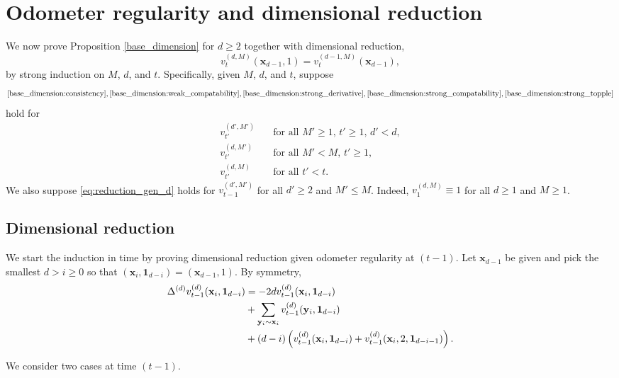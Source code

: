 \documentclass[12pt]{amsart}
\begin{document}
	\section{Odometer regularity and dimensional reduction} \label{sec:dim_reduction}
	We now prove Proposition \ref{base_dimension} for $d \geq 2$ together with dimensional reduction,
	\begin{equation} \label{eq:reduction_gen_d}
	v_t^{(d,M)}(\mathbf{x}_{d-1},1) = v_{t}^{(d-1,M)}(\mathbf{x}_{d-1}),
	\end{equation}
	 by strong induction on $M$, $d$, and $t$. Specifically, given $M$, $d$, and $t$, suppose
	 \[ \eqref{base_dimension:consistency},\eqref{base_dimension:weak_compatability},\eqref{base_dimension:strong_derivative},\eqref{base_dimension:strong_compatability}, \eqref{base_dimension:strong_topple}
	 \]
	 hold for
	\begin{align*}
	v_{t'}^{(d', M')} &\quad \mbox{for all $M' \geq 1$, $t' \geq 1$, $d' < d$}, \\
	v_{t'}^{(d, M')} &\quad \mbox{for all $M' < M$, $t' \geq 1$}, \\
	v_{t'}^{(d, M)} &\quad \mbox{for all $t' < t$}.
	\end{align*}
	We also suppose  \eqref{eq:reduction_gen_d} holds for $v_{t-1}^{(d',M')}$ for all $d' \geq 2$ and $M' \leq M$.
	Indeed, $v_{1}^{(d,M)} \equiv 1$ for all $d \geq 1$ and $M \geq 1$.

	\subsection{Dimensional reduction} \label{subsec:dim_reduction}
	We start the induction in time by proving dimensional reduction given odometer regularity at $(t-1)$. 
	Let $\mathbf{x}_{d-1}$ be given and pick the smallest $d > i \geq 0$ so that
	$(\mathbf{x}_i, \mathbf{1}_{d-i}) = (\mathbf{x}_{d-1},1)$. 
	By symmetry, 
	\begin{align}
	\notag  \Delta^{(d)} v_{t-1}^{(d)}(\mathbf{x}_{i}, \mathbf{1}_{d-i}) &= -2 d v_{t-1}^{(d)}(\mathbf{x}_{i}, \mathbf{1}_{d-i}) \\  
	\notag  &+  \sum_{\mathbf{y}_{i} \sim \mathbf{x}_{i}} v_{t-1}^{(d)}(\mathbf{y}_{i}, \mathbf{1}_{d-i}) \\
	\notag  &+ (d-i) \left( v_{t-1}^{(d)}(\mathbf{x}_{i}, \mathbf{1}_{d-i})   + v_{t-1}^{(d)}(\mathbf{x}_{i},2, \mathbf{1}_{d-i-1})  \right).
	\end{align}
	
	We consider two cases at time $(t-1)$. 
	
\end{document}
